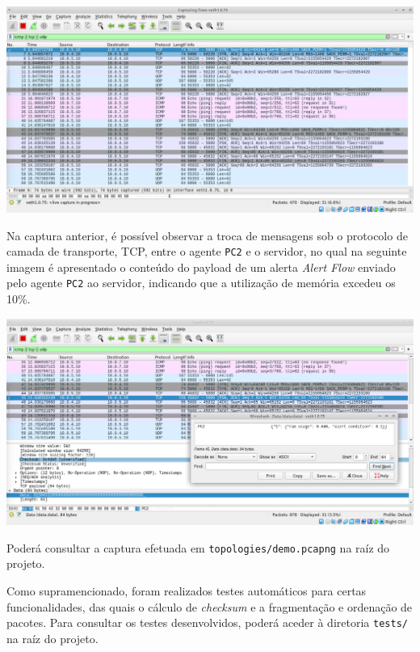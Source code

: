 \documentclass[a4paper,12pt]{scrreprt}
\begin{document}
\begin{minipage}{\textwidth}
    \centering
    \includegraphics[width=\textwidth]{img/demo/wireshark_capture.png}
    \label{fig:demo_wireshark_capture}
\end{minipage}

Na captura anterior, é possível observar a troca de mensagens sob o protocolo de
camada de transporte, TCP, entre o agente \texttt{PC2} e o servidor, no qual na
seguinte imagem é apresentado o conteúdo do payload de um alerta \textit{Alert Flow}
enviado pelo agente \texttt{PC2} ao servidor, indicando que a utilização de memória
excedeu os 10\%.

\begin{minipage}{\textwidth}
    \centering
    \includegraphics[width=\textwidth]{img/demo/wireshark_tcp_alertflow_data.png}
    \label{fig:demo_wireshark_tcp_alertflow_data}
\end{minipage}

Poderá consultar a captura efetuada em \texttt{topologies/demo.pcapng} na raíz do projeto.

Como supramencionado, foram realizados testes automáticos para certas funcionalidades,
das quais o cálculo de \textit{checksum} e a fragmentação e ordenação de pacotes. Para
consultar os testes desenvolvidos, poderá aceder à diretoria \texttt{tests/} na raíz do projeto.
\end{document}

